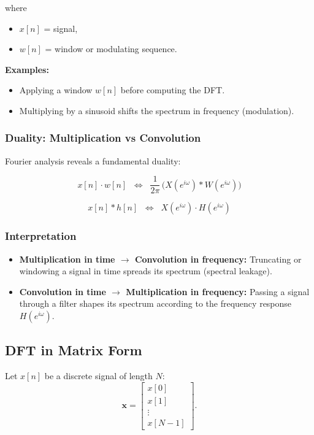 \documentclass[a4paper,12pt]{article}
\begin{document}
where
\begin{itemize}
    \item $x[n]$ = signal,
    \item $w[n]$ = window or modulating sequence.
\end{itemize}

\textbf{Examples:}
\begin{itemize}
    \item Applying a window $w[n]$ before computing the DFT.
    \item Multiplying by a sinusoid shifts the spectrum in frequency (modulation).
\end{itemize}

\subsubsection{Duality: Multiplication vs Convolution}

Fourier analysis reveals a fundamental duality:

\[
x[n] \cdot w[n] 
\;\;\Longleftrightarrow\;\; 
\frac{1}{2\pi}\,\big( X(e^{i\omega}) * W(e^{i\omega}) \big)
\]

\[
x[n] * h[n] 
\;\;\Longleftrightarrow\;\; 
X(e^{i\omega}) \cdot H(e^{i\omega})
\]

\subsubsection{Interpretation}

\begin{itemize}
    \item \textbf{Multiplication in time $\to$ Convolution in frequency:}  
    Truncating or windowing a signal in time spreads its spectrum (spectral leakage).

    \item \textbf{Convolution in time $\to$ Multiplication in frequency:}  
    Passing a signal through a filter shapes its spectrum according to the frequency response $H(e^{i\omega})$.
\end{itemize}

\subsection{DFT in Matrix Form}

Let $x[n]$ be a discrete signal of length $N$:
\[
\mathbf{x} = 
\begin{bmatrix}
x[0] \\ x[1] \\ \vdots \\ x[N-1]
\end{bmatrix}.
\]
\end{document}
